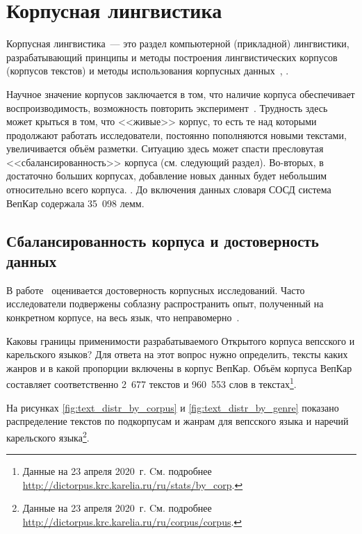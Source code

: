 \section{Корпусная лингвистика} \label{sect_review_corpus_linguistics}

Корпусная лингвистика~--- это раздел компьютерной (прикладной) лингвистики, разрабатывающий принципы и методы  
построения лингвистических корпусов (корпусов текстов)
и методы использования корпусных данных~\cite[с.~3]{Zakharov2005}, \cite[с.~407]{Kibrik2019}.

Научное значение корпусов заключается в том, что наличие корпуса обеспечивает воспроизводимость, возможность повторить эксперимент~\cite[с.~409]{Kibrik2019}. Трудность здесь может крыться в том, что <<живые>> корпус, то есть те над которыми продолжают работать исследователи, постоянно пополняются новыми текстами, увеличивается объём разметки. Ситуацию здесь может спасти пресловутая <<сбалансированность>> корпуса (см. следующий раздел). 
Во-вторых, в достаточно больших корпусах, добавление новых данных будет небольшим относительно всего корпуса. .
До включения данных словаря СОСД система ВепКар содержала 35~098 лемм.

\subsection{Сбалансированность корпуса и достоверность данных}

В работе~\cite{Belikov2013}
оценивается достоверность корпусных исследований. 
Часто исследователи подвержены соблазну распространить опыт, полученный на конкретном корпусе, 
на весь язык, что неправомерно~\cite{Belikov2013}.

Каковы границы применимости разрабатываемого Открытого корпуса вепсского и карельского языков? 
Для ответа на этот вопрос нужно определить, тексты каких жанров и в какой пропорции включены в корпус ВепКар. 
Объём корпуса ВепКар составляет соответственно 2~677 текстов и 960~553 слов в текстах\footnote{ Данные на 23 апреля 2020~г. Cм. подробнее 
\href{http://dictorpus.krc.karelia.ru/ru/stats/by\_corp}{http://dictorpus.krc.karelia.ru/ru/stats/by\_corp}.}.

На рисунках \ref{fig:text_distr_by_corpus} и \ref{fig:text_distr_by_genre} показано распределение текстов по подкорпусам и жанрам для вепсского языка и наречий карельского языка\footnote{ Данные на 23 апреля 2020~г. Cм. подробнее 
			\href{http://dictorpus.krc.karelia.ru/ru/corpus/corpus}{http://dictorpus.krc.karelia.ru/ru/corpus/corpus}.}.

